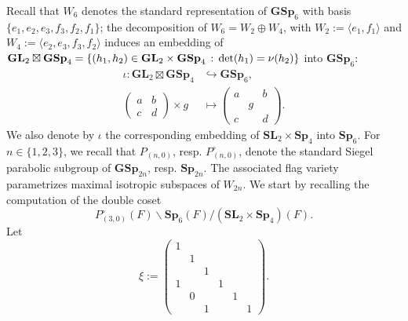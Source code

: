 \documentclass[11pt, reqno]{amsart}
\theoremstyle{plain}
\theoremstyle{definition}
\theoremstyle{remark}
\theoremstyle{plain}
\def\SL{{\mathbf{SL}}}
\def\GSp{{\mathbf{GSp}}}
\def\Sp{{\mathbf{Sp}}}
\def\GL{\mathbf{GL}}
\begin{document}
Recall that $W_6$ denotes the standard representation of $\GSp_6$ with basis 
  $\{e_1,e_2,e_3,f_3,f_2,f_1\}$; the decomposition of $W_6 = W_2 \oplus W_4$, with $W_2:=\langle e_1,f_1\rangle$ and $W_4:=\langle e_2,e_3, f_3, f_2\rangle$ induces an embedding of $\GL_2\boxtimes \GSp_4 = \{(h_1,h_2)\in \GL_2\times \GSp_4\,:\, {\rm det}(h_1) = \nu(h_2)\}$ into $\GSp_6$: 
\begin{align*}
    \iota:\GL_2\boxtimes \GSp_4 &\hookrightarrow \GSp_6,\\
    \left(\begin{smallmatrix}a&b\\c&d\end{smallmatrix}\right)\times g&\mapsto \left(\begin{smallmatrix}
        a& &b\\ &g& \\c& &d
    \end{smallmatrix}\right).
\end{align*}
We also denote by $\iota$ the corresponding embedding of  $\SL_2\times \Sp_4$ into $\Sp_6$.
For $n \in \{ 1,2,3 \}$, we recall that $P_{(n,0)}$, resp. $P_{(n,0)}^\circ$, denote the standard Siegel parabolic subgroup of $\GSp_{2n}$, resp. $\Sp_{2n}$. The associated flag variety parametrizes maximal isotropic subspaces of $W_{2n}$. We start by recalling the computation of the double coset \[P_{(3,0)}^\circ(F) \backslash \Sp_6(F) / (\SL_2\times \Sp_4)(F).  \]
 Let \begin{equation}\label{openorbitelement}\xi := \left(\begin{smallmatrix}
      1&&&&&\\&1&&&&\\&&1 &&& \\1&&&1&&\\&0&&&1&\\&&1&&&1
\end{smallmatrix}\right).\end{equation}
\end{document}

